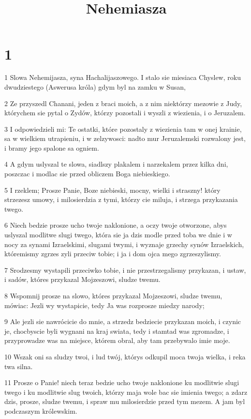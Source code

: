 

\title{Nehemiasza}


\chapter{1}

\par 1 Slowa Nehemijasza, syna Hachalijaszowego. I stalo sie miesiaca Chyslew, roku dwudziestego (Aswerusa króla) gdym byl na zamku w Susan,
\par 2 Ze przyszedl Chanani, jeden z braci moich, a z nim niektórzy mezowie z Judy, którychem sie pytal o Zydów, którzy pozostali i wyszli z wiezienia, i o Jeruzalem.
\par 3 I odpowiedzieli mi: Te ostatki, które pozostaly z wiezienia tam w onej krainie, sa w wielkiem utrapieniu, i w zelzywosci: nadto mur Jeruzalemski rozwalony jest, i bramy jego spalone sa ogniem.
\par 4 A gdym uslyszal te slowa, siadlszy plakalem i narzekalem przez kilka dni, poszczac i modlac sie przed obliczem Boga niebieskiego.
\par 5 I rzeklem; Prosze Panie, Boze niebieski, mocny, wielki i straszny! który strzezesz umowy, i milosierdzia z tymi, którzy cie miluja, i strzega przykazania twego.
\par 6 Niech bedzie prosze ucho twoje naklonione, a oczy twoje otworzone, abys uslyszal modlitwe slugi twego, która sie ja dzis modle przed toba we dnie i w nocy za synami Izraelskimi, slugami twymi, i wyznaje grzechy synów Izraelskich, któremismy zgrzes zyli przeciw tobie; i ja i dom ojca mego zgrzeszylismy.
\par 7 Srodzesmy wystapili przeciwko tobie, i nie przestrzegalismy przykazan, i ustaw, i sadów, któres przykazal Mojzeszowi, sludze twemu.
\par 8 Wspomnij prosze na slowo, któres przykazal Mojzeszowi, sludze twemu, mówiac: Jezli wy wystapicie, tedy Ja was rozprosze miedzy narody;
\par 9 Ale jezli sie nawrócicie do mnie, a strzedz bedziecie przykazan moich, i czynic je, chocbyscie byli wygnani na kraj swiata, tedy i stamtad was zgromadze, i przyprowadze was na miejsce, którem obral, aby tam przebywalo imie moje.
\par 10 Wszak oni sa sludzy twoi, i lud twój, którys odkupil moca twoja wielka, i reka twa silna.
\par 11 Prosze o Panie! niech teraz bedzie ucho twoje naklonione ku modlitwie slugi twego i ku modlitwie slug twoich, którzy maja wole bac sie imienia twego; a zdarz dzis, prosze, sludze twemu, i spraw mu milosierdzie przed tym mezem. A jam byl podczaszym królewskim.

